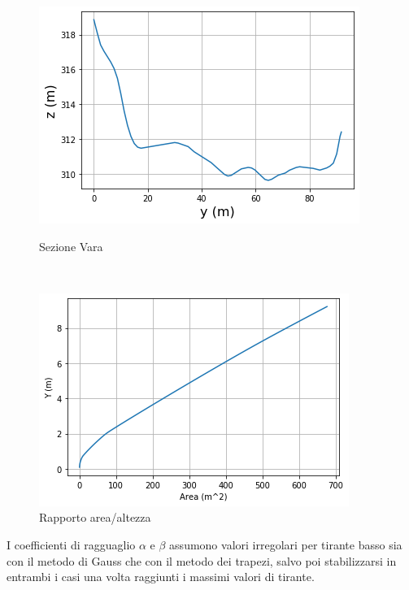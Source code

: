 \documentclass[12pt]{article} %
\begin{document}
\begin{figure}[H]
\begin{minipage}[b]{8.5cm}
\centering
    \includegraphics[width=1 \textwidth]{sezioneva.png}
    \caption{Sezione Vara}
    \label{fig:Vara_sezione}
\end{minipage}
\ \hspace{2mm} \hspace{3mm} \
\begin{minipage}[b]{8.5cm}
    \centering
    \includegraphics[width=1 \textwidth]{rapporto area altezzava.png}
    \caption{Rapporto area/altezza}
    \label{fig:Vara_area/altezza}
\end{minipage}
\end{figure}

\noindent I coefficienti di ragguaglio $\alpha$ e $\beta$ assumono valori irregolari per tirante basso sia con il metodo di Gauss che con il metodo dei trapezi, salvo poi stabilizzarsi in entrambi i casi una volta raggiunti i massimi valori di tirante.
\end{document}
